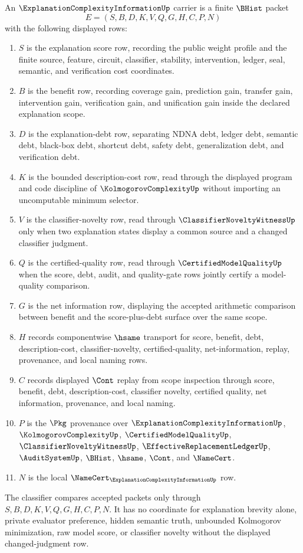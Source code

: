 \begin{definition}
\label{def:explanation-complexity-information-carrier}
An $\ExplanationComplexityInformationUp$ carrier is a finite $\BHist$ packet
$$
E=(S,B,D,K,V,Q,G,H,C,P,N)
$$
with the following displayed rows:
\begin{enumerate}
\item $S$ is the explanation score row, recording the public weight profile and the finite source, feature, circuit, classifier, stability, intervention, ledger, seal, semantic, and verification cost coordinates.
\item $B$ is the benefit row, recording coverage gain, prediction gain, transfer gain, intervention gain, verification gain, and unification gain inside the declared explanation scope.
\item $D$ is the explanation-debt row, separating NDNA debt, ledger debt, semantic debt, black-box debt, shortcut debt, safety debt, generalization debt, and verification debt.
\item $K$ is the bounded description-cost row, read through the displayed program and code discipline of $\KolmogorovComplexityUp$ without importing an uncomputable minimum selector.
\item $V$ is the classifier-novelty row, read through $\ClassifierNoveltyWitnessUp$ only when two explanation states display a common source and a changed classifier judgment.
\item $Q$ is the certified-quality row, read through $\CertifiedModelQualityUp$ when the score, debt, audit, and quality-gate rows jointly certify a model-quality comparison.
\item $G$ is the net information row, displaying the accepted arithmetic comparison between benefit and the score-plus-debt surface over the same scope.
\item $H$ records componentwise $\hsame$ transport for score, benefit, debt, description-cost, classifier-novelty, certified-quality, net-information, replay, provenance, and local naming rows.
\item $C$ records displayed $\Cont$ replay from scope inspection through score, benefit, debt, description-cost, classifier novelty, certified quality, net information, provenance, and local naming.
\item $P$ is the $\Pkg$ provenance over $\ExplanationComplexityInformationUp$, $\KolmogorovComplexityUp$, $\CertifiedModelQualityUp$, $\ClassifierNoveltyWitnessUp$, $\EffectiveReplacementLedgerUp$, $\AuditSystemUp$, $\BHist$, $\hsame$, $\Cont$, and $\NameCert$.
\item $N$ is the local $\NameCert_{\ExplanationComplexityInformationUp}$ row.
\end{enumerate}
The classifier compares accepted packets only through $S,B,D,K,V,Q,G,H,C,P,N$. It has no coordinate for explanation brevity alone, private evaluator preference, hidden semantic truth, unbounded Kolmogorov minimization, raw model score, or classifier novelty without the displayed changed-judgment row.
\end{definition}

